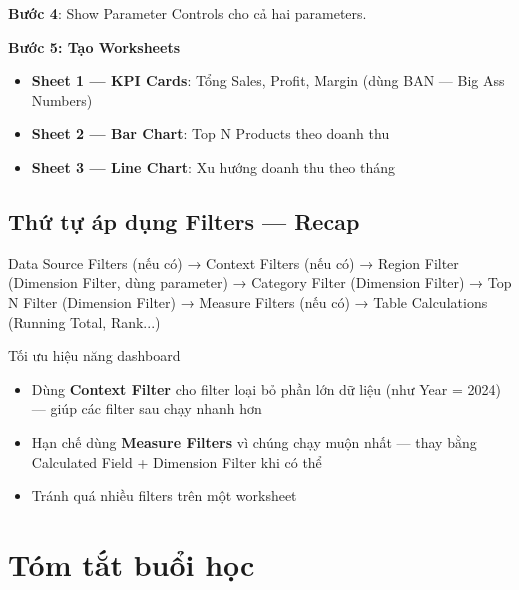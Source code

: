 \documentclass[12pt]{article}
\begin{document}
\noindent \textbf{Bước 4}: Show Parameter Controls cho cả hai parameters.

\noindent \textbf{Bước 5: Tạo Worksheets}

\begin{itemize}[nosep]
    \item \textbf{Sheet 1 --- KPI Cards}: Tổng Sales, Profit, Margin (dùng BAN --- Big Ass Numbers)
    \item \textbf{Sheet 2 --- Bar Chart}: Top N Products theo doanh thu
    \item \textbf{Sheet 3 --- Line Chart}: Xu hướng doanh thu theo tháng
\end{itemize}

\subsection{Thứ tự áp dụng Filters --- Recap}

\begin{aivncodebox}[]
\begin{python}
Data Source Filters (nếu có)
    → Context Filters (nếu có)
    → Region Filter (Dimension Filter, dùng parameter)
    → Category Filter (Dimension Filter)
    → Top N Filter (Dimension Filter)
    → Measure Filters (nếu có)
    → Table Calculations (Running Total, Rank...)
\end{python}
\end{aivncodebox}

\begin{guidelinebox}{Tối ưu hiệu năng dashboard}
\begin{itemize}[nosep]
    \item Dùng \textbf{Context Filter} cho filter loại bỏ phần lớn dữ liệu (như Year = 2024) --- giúp các filter sau chạy nhanh hơn
    \item Hạn chế dùng \textbf{Measure Filters} vì chúng chạy muộn nhất --- thay bằng Calculated Field + Dimension Filter khi có thể
    \item Tránh quá nhiều filters trên một worksheet
\end{itemize}
\end{guidelinebox}

\newpage
\section{Tóm tắt buổi học}
\label{section:summary}
\end{document}
